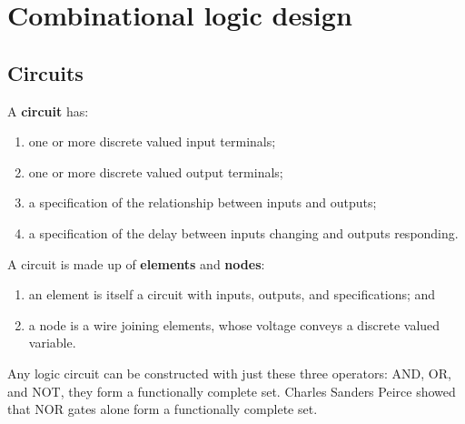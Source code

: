\chapter{Combinational logic design}

\section{Circuits}

\begin{definition}
    A \textbf{circuit} has:
    \begin{enumerate}
        \item one or more discrete valued input terminals;
        \item one or more discrete valued output terminals;
        \item a specification of the relationship between inputs and outputs;
        \item a specification of the delay between inputs changing and outputs responding.
    \end{enumerate}
    
    A circuit is made up of \textbf{elements} and \textbf{nodes}:
    \begin{enumerate}
        \item an element is itself a circuit with inputs, outputs, and specifications; and
        \item a node is a wire joining elements, whose voltage conveys a discrete valued variable.
    \end{enumerate}
\end{definition}

Any logic circuit can be constructed with just these three operators: AND, OR, and NOT, they form a functionally complete set. Charles Sanders Peirce showed that NOR gates alone form a functionally complete set.



